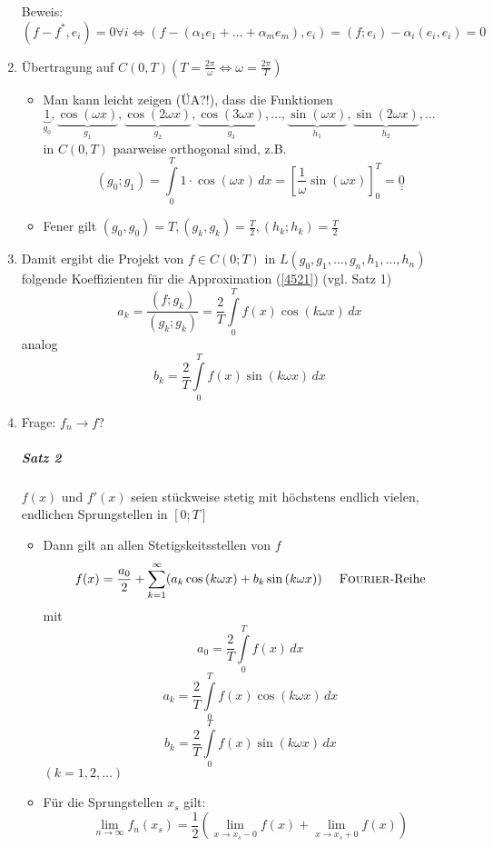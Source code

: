 \documentclass[a4paper]{scrartcl}
\begin{document}
\begin{enumerate}
Beweis: $(f-f^*,e_i) = 0 \forall i \Leftrightarrow (f-(\alpha_1 e_1 + \dots + \alpha_m e_m), e_i) = (f;e_i) - \alpha_i (e_i,e_i)=0$

\item Übertragung auf $C(0,T) (T= \frac{2\pi}{\omega} \Leftrightarrow \omega = \frac{2\pi}{T})$
\begin{itemize}
\item Man kann leicht zeigen (ÜA?!), dass die Funktionen\\
$\underbrace{1}_{g_0},\underbrace{\cos{(\omega x)}}_{g_1}, \underbrace{\cos{(2\omega x)}}_{g_2}, \underbrace{\cos{(3\omega x)}}_{g_3}, \dots, \underbrace{\sin{(\omega x)}}_{h_1}, \underbrace{\sin{(2\omega x)}}_{h_2}, \dots$\\
in $C(0,T)$ paarweise orthogonal sind, z.B.
\[ (g_0;g_1) = \int\limits_{0}^{T} 1 \cdot \cos{(\omega x)} \, dx = \left [ \frac{1}{\omega} \sin{(\omega x)} \right ]_0^T = \underline{\underline{0}}\]
\item Fener gilt $(g_0,g_0) = T, (g_k,g_k) = \frac{T}{2} , (h_k;h_k)= \frac{T}{2}$
\end{itemize}
\item Damit ergibt die Projekt von $f \in C (0;T)$ in $L(g_0,g_1,\dots , g_n,h_1,\dots,h_n)$ folgende Koeffizienten für die Approximation (\ref{4521}) (vgl. Satz 1)
\[ a_k = \frac{(f;g_k)}{(g_k;g_k)} = \frac{2}{T} \int\limits_0^T f(x) \cos{(k\omega x)} \, dx \]
analog
\[ b_k = \frac{2}{T} \int\limits_0^T f(x) \sin{(k \omega x)} \, dx\]
\item Frage: $f_n \to f$?

\subparagraph{Satz 2} $f(x)$ und $f'(x)$ seien stückweise stetig mit höchstens endlich vielen, endlichen Sprungstellen in $[0;T]$
\begin{itemize}
\item Dann gilt an allen Stetigskeitsstellen von $f$
\[ f(x) = \frac{a_0}{2} + \sum\limits_{k=1}^\infty (a_k \cos{(k \omega x)} + b_k \sin{(k \omega x)} ) \quad  \text{ \textsc{Fourier}-Reihe} \]
mit \[a_0 = \frac{2}{T} \int\limits_0^T f(x) \, dx \]
\[a_k = \frac{2}{T} \int\limits_0^T f(x) \cos{(k\omega x)} \, dx\]
\[b_k = \frac{2}{T} \int\limits_0^T f(x) \sin{(k \omega x)} \, dx\]
$(k= 1,2,\dots)$
\item Für die Sprungstellen $x_s$ gilt:
\[ \lim\limits_{n\to \infty} f_n (x_s) = \frac{1}{2} ( \lim\limits_{x \to x_s -0} f(x) + \lim\limits_{x \to x_s +0} f(x) )\]
\end{itemize}
\end{enumerate}
\end{document}
